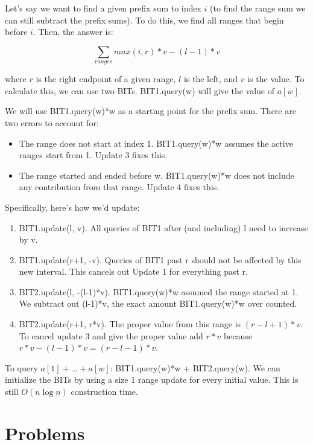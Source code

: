 \documentclass{article}
\begin{document}
            Let's say we want to find a given prefix sum to index $i$ (to find the range sum we can still subtract the prefix sums). To do this, we find all ranges that begin before $i$. Then, the answer is:
            
            $$ \sum_{ranges}{max(i, r)*v-(l-1)*v} $$
            
            where $r$ is the right endpoint of a given range, $l$ is the left, and $v$ is the value.
            To calculate this, we can use two BITs. BIT1.query(w) will give the value of $a[w]$.
            
            We will use BIT1.query(w)*w as a starting point for the prefix sum.  There are two errors to account for:
            \begin{itemize}
                \item The range does not start at index 1. BIT1.query(w)*w assumes the active ranges start from 1. Update 3 fixes this.
                \item The range started and ended before w. BIT1.query(w)*w does not include any contribution from that range. Update 4 fixes this.
            \end{itemize}
            
            Specifically, here's how we'd update:
            \begin{enumerate}
                \item BIT1.update(l, v). All queries of BIT1 after (and including) l need to increase by v.
                \item BIT1.update(r+1, -v). Queries of BIT1 past r should not be affected by this new interval.  This cancels out Update 1 for everything past r.
                \item BIT2.update(l, -(l-1)*v). BIT1.query(w)*w assumed the range started at 1. We subtract out (l-1)*v, the exact amount BIT1.query(w)*w over counted.
                \item BIT2.update(r+1, r*v). The proper value from this range is $(r-l+1)*v$. To cancel update 3 and give the proper value add $r*v$ because $r*v-(l-1)*v=(r-l-1)*v$.
            \end{enumerate}
            
            To query $a[1]+...+a[w]$: BIT1.query(w)*w + BIT2.query(w).
            We can initialize the BITs by using a size 1 range update for every initial value.  This is still $O(n\log n)$ construction time.
            
\section{Problems}
\end{document}
